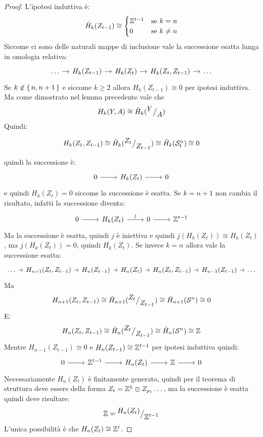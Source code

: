 \begin{proof}
  L'ipotesi induttiva è:
  \[
    \tilde{H}_k(Z_{t-1}) \cong
    \begin{cases}
      \mathbb{Z}^{t-1} & \text{se $ k = n $} \\
      0 & \text{se $ k \not = n $}
    \end{cases}
  \]
  Siccome ci sono delle naturali mappe di inclusione vale
  la successione esatta lunga in omologia relativa:
  \[
    \begin{tikzcd}[nodes={column sep=10pt}]
      \dots \rar & H_k(Z_{t-1}) \rar & H_k(Z_t) \rar & H_k(Z_t, Z_{t-1}) \rar & \dots %
    \end{tikzcd}
  \]
  Se $ k \not \in \set{n, n+1} $ e siccome $ k \geq 2 $ allora $ H_k(Z_{t-1}) \cong 0 $ per ipotesi induttiva.
  Ma come dimostrato nel lemma precedente vale che
  \[
    H_k(Y,A) \cong \tilde{H}_k({^{\textstyle Y}\big/_{\textstyle A}})
  \]
  Quindi:
  \[
    \begin{tikzcd}
      H_k(Z_t, Z_{t-1}) \cong \tilde{H}_k(\quot{Z_t}{Z_{t-1}}) \cong \tilde{H}_k(\Sph{n}_t) \cong 0 %
    \end{tikzcd}
  \]
  quindi la successione è:
  \[
    \begin{tikzcd}
      0 \rar   & H_k(Z_t) \rar  & 0
    \end{tikzcd}
  \]
  e quindi $ H_{k}(Z_t) = 0 $ siccome la successione è esatta.
  Se $ k = n + 1 $ non cambia il risultato, infatti la successione diventa:
  \[
    \begin{tikzcd}
      0 \rar & H_k(Z_t) \rar{j} & 0 \rar & \Z^{t-1}
    \end{tikzcd}
  \]
  Ma la successione è esatta, quindi $ j $ è iniettiva e quindi $ j(H_k(Z_t)) \cong H_k(Z_t) $,
  ma $ j(H_k(Z_t)) = 0 $, quindi $ H_k(Z_t) $.
  Se invece $ k = n $ allora vale la successione esatta:
  \[
    \begin{tikzcd}[nodes={column sep=7pt}]
      \dots \rar & H_{n+1}(Z_t, Z_{t-1}) \rar & H_n(Z_{t-1}) \rar & H _n(Z_t) \rar  & H_n(Z_t, Z_{t-1}) \rar & H_{n-1}(Z_{t-1}) \rar & \dots
    \end{tikzcd}
  \]
  Ma
  \[
    H_{n+1}(Z_t, Z_{t-1}) \cong \tilde{H}_{n+1}({^{\textstyle Z_t}\big/_{\textstyle Z_{t-1}}}) \cong \tilde{H}_{n+1}(\mathcal{S}^{n}) \cong 0
  \]
  E:
  \[
    H_{n}(Z_t, Z_{t-1}) \cong \tilde{H}_{n}({^{\textstyle Z_t}\big/_{\textstyle Z_{t-1}}}) \cong \tilde{H}_{n}(\mathcal{S}^{n}) \cong \mathbb{Z}
  \]
  Mentre $ H_{n-1}(Z_{t-1}) \cong 0 $ e $ H_{n}(Z_{t-1}) \cong \mathbb{Z}^{t-1} $ per ipotesi induttiva quindi:
  \[
    \begin{tikzcd}
      0 \rar   & \Z^{t-1} \rar & H_n(Z_t) \rar & \Z \rar & 0
    \end{tikzcd}
  \]
  Necessariamente $ H_n(Z_t) $ è finitamente generato, quindi per il teorema
  di struttura deve essere della forma $ Z_t = \mathbb{Z}^k \oplus Z_{p_1} \dots $, ma la successione
  è esatta quindi deve risultare:
  \[
    \mathbb{Z} = {^{\textstyle H_n(Z_t)}\big/_{\textstyle \mathbb{Z}^{t-1}}}
  \]
  L'unica possibilità è che $ H_n(Z_t) \cong \mathbb{Z}^t $.
\end{proof}

